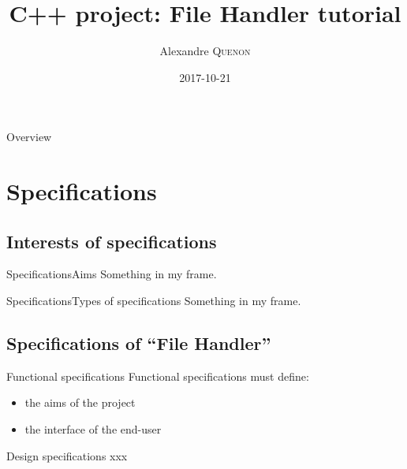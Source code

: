 \documentclass[11pt,handout]{beamer}
\author{Alexandre \textsc{Quenon}}
\date{2017-10-21}%
\title[C++ File Handler tutorial]{C++ project: File Handler tutorial}
\begin{document}
\begin{frame}
	\titlepage
\end{frame}

\begin{frame}{Overview}
	\tableofcontents
\end{frame}


\section{Specifications}

	\subsection{Interests of specifications}
	
		\begin{frame}{Specifications}{Aims}
			Something in my frame.
		\end{frame}
		
		\begin{frame}{Specifications}{Types of specifications}
			Something in my frame.
		\end{frame}
	
	
	\subsection{Specifications of \enquote{File Handler}}
	
		\begin{frame}{Functional specifications}
			Functional specifications must define:
			\begin{itemize}
				\item the aims of the project
				\item the interface of the end-user
			\end{itemize}
		\end{frame}
	
		\begin{frame}{Design specifications}
			xxx
		\end{frame}
	
	
	
\end{document}
